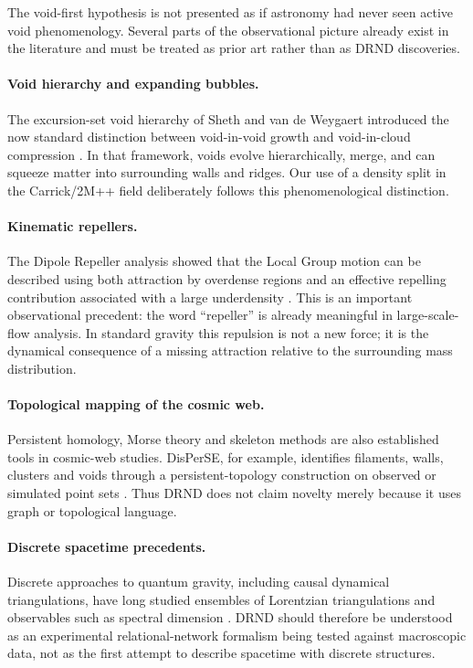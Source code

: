 \documentclass[11pt,a4paper]{article}
\begin{document}
The void-first hypothesis is not presented as if astronomy had never seen active void phenomenology. Several parts of the observational picture already exist in the literature and must be treated as prior art rather than as DRND discoveries.

\paragraph{Void hierarchy and expanding bubbles.}
The excursion-set void hierarchy of Sheth and van de Weygaert introduced the now standard distinction between void-in-void growth and void-in-cloud compression \cite{sheth2004}. In that framework, voids evolve hierarchically, merge, and can squeeze matter into surrounding walls and ridges. Our use of a density split in the Carrick/2M++ field deliberately follows this phenomenological distinction.

\paragraph{Kinematic repellers.}
The Dipole Repeller analysis showed that the Local Group motion can be described using both attraction by overdense regions and an effective repelling contribution associated with a large underdensity \cite{hoffman2017}. This is an important observational precedent: the word ``repeller'' is already meaningful in large-scale-flow analysis. In standard gravity this repulsion is not a new force; it is the dynamical consequence of a missing attraction relative to the surrounding mass distribution.

\paragraph{Topological mapping of the cosmic web.}
Persistent homology, Morse theory and skeleton methods are also established tools in cosmic-web studies. DisPerSE, for example, identifies filaments, walls, clusters and voids through a persistent-topology construction on observed or simulated point sets \cite{sousbie2011}. Thus DRND does not claim novelty merely because it uses graph or topological language.

\paragraph{Discrete spacetime precedents.}
Discrete approaches to quantum gravity, including causal dynamical triangulations, have long studied ensembles of Lorentzian triangulations and observables such as spectral dimension \cite{ambjorn2005}. DRND should therefore be understood as an experimental relational-network formalism being tested against macroscopic data, not as the first attempt to describe spacetime with discrete structures.
\end{document}
